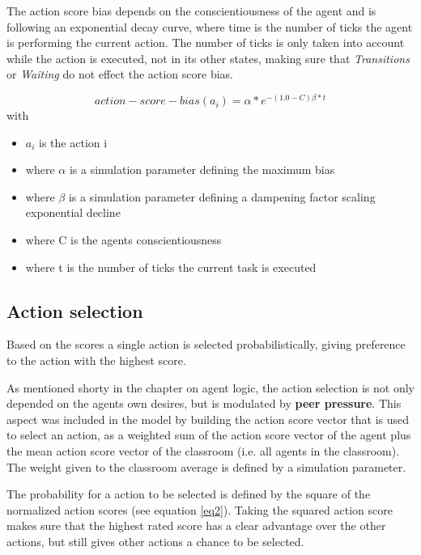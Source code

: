 \bb

The action score bias depends on the conscientiousness of the agent and is following an
exponential decay curve, where time is the number of ticks the agent is performing
the current action. The number of ticks is only taken into account while the action is executed,
not in its other states, making sure that \textit{Transitions} or \textit{Waiting}
do not effect the action score bias.

\begin{equation}
    \label{eq1}
    action-score-bias(a_i) = \alpha * e^{-(1.0 - C) \beta * t}
\end{equation}
with
\begin{itemize}
    \item $a_i$ is the action i
    \item where $\alpha$ is a simulation parameter defining the maximum bias
    \item where $\beta$ is a simulation parameter defining a dampening factor scaling exponential decline
    \item where C is the agents conscientiousness
    \item where t is the number of ticks the current task is executed
\end{itemize}

\subsection{Action selection}
Based on the scores a single action is selected probabilistically, giving preference
to the action with the highest score.

\bb

As mentioned shorty in the chapter on agent logic, the action selection is not only
depended on the agents own desires, but is modulated by \textbf{peer pressure}.
This aspect was included in the model by building the action score vector that is
used to select an action, as a weighted sum of the action score vector of the agent
plus the mean action score vector of the classroom (i.e. all agents in the classroom).
The weight given to the classroom average is defined by a simulation parameter.

\bb

The probability for a action to be selected is defined by the square of the normalized
action scores (see equation \ref{eq2}). Taking the squared action score makes sure
that the highest rated score has a clear advantage over the other actions, but still
gives other actions a chance to be selected.

